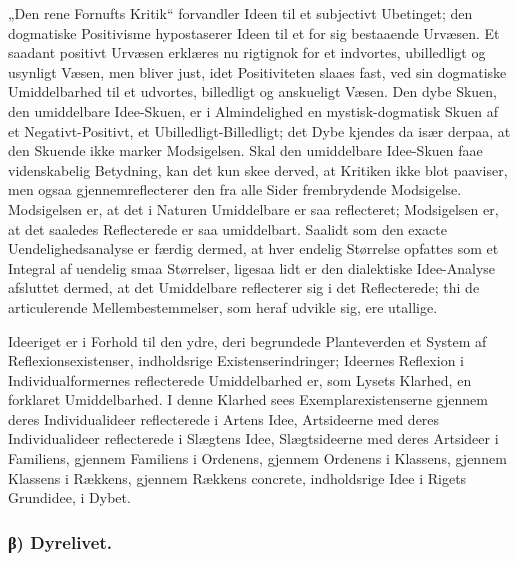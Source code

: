 \documentclass[11pt]{book}
\newcommand{\opage}[1]{\marginnote{\footnotesize\textit{[#1]}}}
\begin{document}
\opage{327} \setcounter{footnote}{0}%
„Den rene Fornufts Kritik“ forvandler Ideen til et subjectivt
Ubetinget; den dogmatiske Positivisme hypostaserer Ideen til et for sig
bestaaende Urvæsen. Et saadant positivt
\opage{328} \setcounter{footnote}{0}%
Urvæsen erklæres nu rigtignok for et indvortes, ubilledligt og usynligt
Væsen, men bliver just, idet Positiviteten slaaes fast, ved sin dogmatiske
Umiddelbarhed til et udvortes, billedligt og anskueligt Væsen. Den dybe
Skuen, den umiddelbare Idee-Skuen, er i Almindelighed en mystisk-dogmatisk
Skuen af et Negativt-Positivt, et Ubilledligt-Billedligt; det Dybe kjendes
da især derpaa, at den Skuende ikke marker
Modsigelsen. Skal den umiddelbare Idee-Skuen faae videnskabelig Betydning,
kan det kun skee derved, at Kritiken ikke blot paaviser, men ogsaa
gjennemreflecterer den fra alle Sider frembrydende Modsigelse. Modsigelsen
er, at det i Naturen Umiddelbare er saa reflecteret; Modsigelsen er, at det
saaledes Reflecterede er saa umiddelbart. Saalidt som den exacte
Uendelighedsanalyse er færdig dermed, at hver endelig Størrelse opfattes som
et Integral af uendelig smaa Størrelser, ligesaa lidt er den dialektiske
Idee-Analyse afsluttet dermed, at det Umiddelbare reflecterer sig i det
Reflecterede; thi de articulerende Mellembestemmelser, som heraf udvikle sig,
ere utallige.

Ideeriget er i Forhold til den ydre, deri begrundede Planteverden et System
af Reflexionsexistenser, indholdsrige Existenserindringer; Ideernes Reflexion
i Individualformernes reflecterede Umiddelbarhed er, som Lysets Klarhed, en
forklaret Umiddelbarhed. I denne Klarhed sees Exemplarexistenserne gjennem
deres Individualideer reflecterede i Artens Idee, Artsideerne med deres
Individualideer reflecterede i Slægtens Idee, Slægtsideerne med deres
Artsideer i Familiens, gjennem Familiens i Ordenens, gjennem Ordenens i
Klassens, gjennem Klassens i Rækkens, gjennem Rækkens concrete, indholdsrige
Idee i Rigets Grundidee, i Dybet.

\subsubsection*{β) Dyrelivet.}
\end{document}
